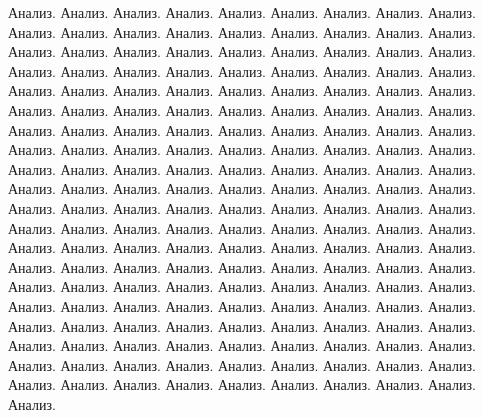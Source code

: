 Анализ. Анализ. Анализ. Анализ. Анализ.
Анализ. Анализ. Анализ. Анализ. Анализ. Анализ. Анализ. Анализ. Анализ. Анализ. Анализ.
Анализ. Анализ. Анализ. Анализ. Анализ.
Анализ. Анализ. Анализ. Анализ. Анализ. Анализ. Анализ. Анализ. Анализ. Анализ. Анализ.
Анализ. Анализ. Анализ. Анализ. Анализ.
Анализ. Анализ. Анализ. Анализ. Анализ. Анализ. Анализ. Анализ. Анализ. Анализ. Анализ.
Анализ. Анализ. Анализ. Анализ. Анализ.
Анализ. Анализ. Анализ. Анализ. Анализ. Анализ. Анализ. Анализ. Анализ. Анализ. Анализ.
Анализ. Анализ. Анализ. Анализ. Анализ.
Анализ. Анализ. Анализ. Анализ. Анализ. Анализ. Анализ. Анализ. Анализ. Анализ. Анализ.
Анализ. Анализ. Анализ. Анализ. Анализ.
Анализ. Анализ. Анализ. Анализ. Анализ. Анализ. Анализ. Анализ. Анализ. Анализ. Анализ.
Анализ. Анализ. Анализ. Анализ. Анализ.
Анализ. Анализ. Анализ. Анализ. Анализ. Анализ. Анализ. Анализ. Анализ. Анализ. Анализ.
Анализ. Анализ. Анализ. Анализ. Анализ.
Анализ. Анализ. Анализ. Анализ. Анализ. Анализ. Анализ. Анализ. Анализ. Анализ. Анализ.
Анализ. Анализ. Анализ. Анализ. Анализ.
Анализ. Анализ. Анализ. Анализ. Анализ. Анализ. Анализ. Анализ. Анализ. Анализ. Анализ.
Анализ. Анализ. Анализ. Анализ. Анализ.
Анализ. Анализ. Анализ. Анализ. Анализ. Анализ. Анализ. Анализ. Анализ. Анализ. Анализ.
Анализ. Анализ. Анализ. Анализ. Анализ.
Анализ. Анализ. Анализ. Анализ. Анализ. Анализ. Анализ. Анализ. Анализ. Анализ. Анализ.
Анализ. Анализ. Анализ. Анализ. Анализ.

